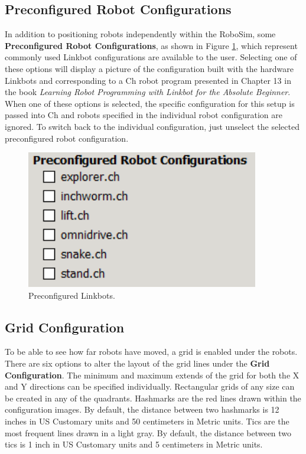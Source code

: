 \documentclass{article}
\begin{document}
\subsection{Preconfigured Robot Configurations}
In addition to positioning robots independently within the RoboSim, some {\bf
Preconfigured Robot Configurations}, as shown in Figure \ref{fig:preconfig},
which represent commonly used Linkbot configurations  are available to the user.
Selecting one of these options will display a picture of the configuration built
with the hardware Linkbots and corresponding to a Ch robot program presented in
Chapter 13 in the book {\em Learning Robot Programming with Linkbot for the
Absolute Beginner}.  When one of these options is selected, the specific
configuration for this setup is passed into Ch and robots specified in the
individual robot configuration are ignored.  To switch back to the individual
configuration, just unselect the selected preconfigured robot configuration.
\begin{figure}[H]
	\begin{center}
		\includegraphics[width=4in]{images/preconfig}
	\end{center}
	\caption{Preconfigured Linkbots.}
	\label{fig:preconfig}
\end{figure}

\subsection{Grid Configuration}
To be able to see how far robots have moved, a grid is enabled under the robots.
There are six options to alter the layout of the grid lines under the {\bf Grid
Configuration}.  The minimum and maximum extends of the grid for both the X and
Y directions can be specified individually.  Rectangular grids of any size can
be created in any of the quadrants.  Hashmarks are the red lines drawn within
the configuration images.  By default, the distance between two hashmarks is 12
inches in US Customary units and 50 centimeters in Metric units.  Tics are the
most frequent lines drawn in a light gray.  By default, the distance between two
tics is 1 inch in US Customary units and 5 centimeters in Metric units.
\end{document}
